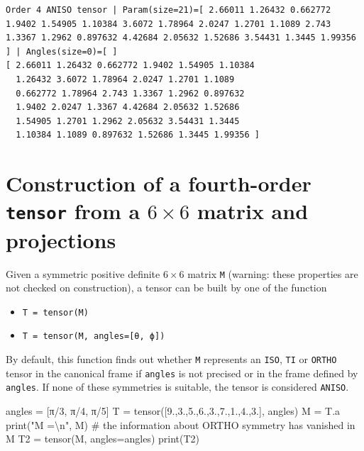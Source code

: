 \documentclass[
  letterpaper,
  DIV=11,
  numbers=noendperiod]{scrreprt}
\newenvironment{Shaded}{\begin{snugshade}}{\end{snugshade}}
\newcommand{\BuiltInTok}[1]{\textcolor[rgb]{0.00,0.23,0.31}{#1}}
\newcommand{\CharTok}[1]{\textcolor[rgb]{0.13,0.47,0.30}{#1}}
\newcommand{\CommentTok}[1]{\textcolor[rgb]{0.37,0.37,0.37}{#1}}
\newcommand{\DecValTok}[1]{\textcolor[rgb]{0.68,0.00,0.00}{#1}}
\newcommand{\FloatTok}[1]{\textcolor[rgb]{0.68,0.00,0.00}{#1}}
\newcommand{\NormalTok}[1]{\textcolor[rgb]{0.00,0.23,0.31}{#1}}
\newcommand{\OperatorTok}[1]{\textcolor[rgb]{0.37,0.37,0.37}{#1}}
\newcommand{\StringTok}[1]{\textcolor[rgb]{0.13,0.47,0.30}{#1}}
\providecommand{\tightlist}{%
  \setlength{\itemsep}{0pt}\setlength{\parskip}{0pt}}\usepackage{longtable,booktabs,array}
\begin{document}
\begin{verbatim}
Order 4 ANISO tensor | Param(size=21)=[ 2.66011 1.26432 0.662772 1.9402 1.54905 1.10384 3.6072 1.78964 2.0247 1.2701 1.1089 2.743 1.3367 1.2962 0.897632 4.42684 2.05632 1.52686 3.54431 1.3445 1.99356 ] | Angles(size=0)=[ ]
[ 2.66011 1.26432 0.662772 1.9402 1.54905 1.10384 
  1.26432 3.6072 1.78964 2.0247 1.2701 1.1089 
  0.662772 1.78964 2.743 1.3367 1.2962 0.897632 
  1.9402 2.0247 1.3367 4.42684 2.05632 1.52686 
  1.54905 1.2701 1.2962 2.05632 3.54431 1.3445 
  1.10384 1.1089 0.897632 1.52686 1.3445 1.99356 ]
\end{verbatim}

\section{\texorpdfstring{Construction of a fourth-order \texttt{tensor}
from a \(6×6\) matrix and
projections}{Construction of a fourth-order tensor from a 6×6 matrix and projections}}\label{construction-of-a-fourth-order-tensor-from-a-66-matrix-and-projections}

Given a symmetric positive definite \(6×6\) matrix \texttt{M} (warning:
these properties are not checked on construction), a tensor can be built
by one of the function

\begin{itemize}
\tightlist
\item
  \texttt{T\ =\ tensor(M)}
\item
  \texttt{T\ =\ tensor(M,\ angles={[}θ,\ ϕ{]})}
\end{itemize}

By default, this function finds out whether \texttt{M} represents an
\texttt{ISO}, \texttt{TI} or \texttt{ORTHO} tensor in the canonical
frame if \texttt{angles} is not precised or in the frame defined by
\texttt{angles}. If none of these symmetries is suitable, the tensor is
considered \texttt{ANISO}.

\begin{Shaded}
\begin{Highlighting}[]
\NormalTok{angles }\OperatorTok{=}\NormalTok{ [π}\OperatorTok{/}\DecValTok{3}\NormalTok{, π}\OperatorTok{/}\DecValTok{4}\NormalTok{, π}\OperatorTok{/}\DecValTok{5}\NormalTok{]}
\NormalTok{T }\OperatorTok{=}\NormalTok{ tensor([}\FloatTok{9.}\NormalTok{,}\FloatTok{3.}\NormalTok{,}\FloatTok{5.}\NormalTok{,}\FloatTok{6.}\NormalTok{,}\FloatTok{3.}\NormalTok{,}\FloatTok{7.}\NormalTok{,}\FloatTok{1.}\NormalTok{,}\FloatTok{4.}\NormalTok{,}\FloatTok{3.}\NormalTok{], angles)}
\NormalTok{M }\OperatorTok{=}\NormalTok{ T.a}
\BuiltInTok{print}\NormalTok{(}\StringTok{"M =}\CharTok{\textbackslash{}n}\StringTok{"}\NormalTok{, M) }\CommentTok{\# the information about ORTHO symmetry has vanished in M}
\NormalTok{T2 }\OperatorTok{=}\NormalTok{ tensor(M, angles}\OperatorTok{=}\NormalTok{angles)}
\BuiltInTok{print}\NormalTok{(T2)}
\end{Highlighting}
\end{Shaded}
\end{document}
